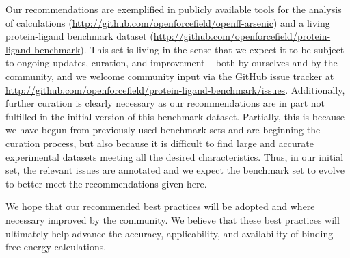 \documentclass[9pt,bestpractices]{livecoms}
\begin{document}
Our recommendations are exemplified in publicly available tools for the analysis of calculations (\url{http://github.com/openforcefield/openff-arsenic})
and a living protein-ligand benchmark dataset (\url{http://github.com/openforcefield/protein-ligand-benchmark}).
%
This set is living in the sense that we expect it to be subject to ongoing updates, curation, and improvement -- both by ourselves and by the community, and we welcome community input via the GitHub issue tracker at \url{http://github.com/openforcefield/protein-ligand-benchmark/issues}. Additionally, further curation is clearly necessary as our recommendations are in part not fulfilled in the initial version of this benchmark dataset. Partially, this is because we have begun from previously used benchmark sets and are beginning the curation process, but also because it is difficult to find large and accurate experimental datasets meeting all the desired characteristics. Thus, in our initial set, the relevant issues are annotated and we expect the benchmark set to evolve to better meet the recommendations given here.

We hope that our recommended best practices will be adopted and where necessary improved by the community. We believe that these best practices will ultimately help advance the accuracy, applicability, and availability of binding free energy calculations. 


\end{document}
